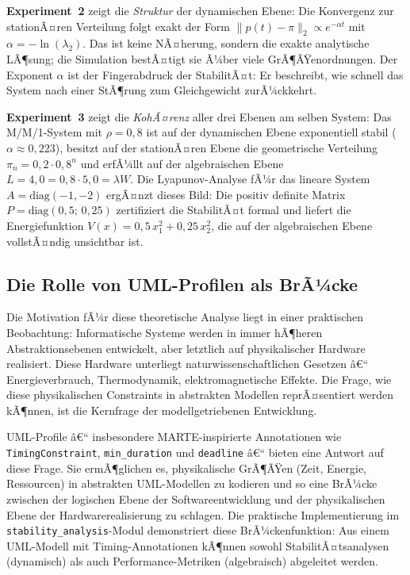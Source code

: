 ﻿\documentclass[a4paper,12pt]{report}
\theoremstyle{definition}
\begin{document}
\textbf{Experiment~2} zeigt die \emph{Struktur} der dynamischen Ebene:
Die Konvergenz zur stationÃ¤ren Verteilung folgt exakt der Form
$\|p(t) - \pi\|_2 \propto e^{-\alpha t}$ mit $\alpha = -\ln(\lambda_2)$.
Das ist keine NÃ¤herung, sondern die exakte analytische LÃ¶sung; die
Simulation bestÃ¤tigt sie Ã¼ber viele GrÃ¶ÃŸenordnungen.  Der Exponent $\alpha$
ist der Fingerabdruck der StabilitÃ¤t: Er beschreibt, wie schnell das System
nach einer StÃ¶rung zum Gleichgewicht zurÃ¼ckkehrt.

\textbf{Experiment~3} zeigt die \emph{KohÃ¤renz} aller drei Ebenen am selben
System: Das M/M/1-System mit $\rho = 0{,}8$ ist auf der dynamischen Ebene
exponentiell stabil ($\alpha \approx 0{,}223$), besitzt auf der stationÃ¤ren
Ebene die geometrische Verteilung $\pi_n = 0{,}2 \cdot 0{,}8^n$ und erfÃ¼llt
auf der algebraischen Ebene $L = 4{,}0 = 0{,}8 \cdot 5{,}0 = \lambda W$.
Die Lyapunov-Analyse fÃ¼r das lineare System $A = \text{diag}(-1,-2)$
ergÃ¤nzt dieses Bild: Die positiv definite Matrix $P = \text{diag}(0{,}5;\,
0{,}25)$ zertifiziert die StabilitÃ¤t formal und liefert die Energiefunktion
$V(x) = 0{,}5\,x_1^2 + 0{,}25\,x_2^2$, die auf der algebraischen Ebene
vollstÃ¤ndig unsichtbar ist.

\subsection{Die Rolle von UML-Profilen als BrÃ¼cke}

Die Motivation fÃ¼r diese theoretische Analyse liegt in einer praktischen
Beobachtung: Informatische Systeme werden in immer hÃ¶heren
Abstraktionsebenen entwickelt, aber letztlich auf physikalischer Hardware
realisiert.  Diese Hardware unterliegt naturwissenschaftlichen Gesetzen â€“
Energieverbrauch, Thermodynamik, elektromagnetische Effekte.  Die Frage,
wie diese physikalischen Constraints in abstrakten Modellen reprÃ¤sentiert
werden kÃ¶nnen, ist die Kernfrage der modellgetriebenen Entwicklung.

UML-Profile â€“ insbesondere MARTE-inspirierte Annotationen wie
\texttt{TimingConstraint}, \texttt{min\_duration} und \texttt{deadline} â€“
bieten eine Antwort auf diese Frage.  Sie ermÃ¶glichen es, physikalische
GrÃ¶ÃŸen (Zeit, Energie, Ressourcen) in abstrakten UML-Modellen zu kodieren
und so eine BrÃ¼cke zwischen der logischen Ebene der Softwareentwicklung
und der physikalischen Ebene der Hardwarerealisierung zu schlagen.  Die
praktische Implementierung im \texttt{stability\_analysis}-Modul
demonstriert diese BrÃ¼ckenfunktion: Aus einem UML-Modell mit
Timing-Annotationen kÃ¶nnen sowohl StabilitÃ¤tsanalysen (dynamisch) als auch
Performance-Metriken (algebraisch) abgeleitet werden.
\end{document}
